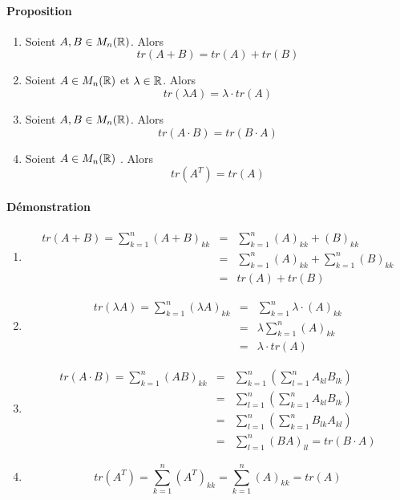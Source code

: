 \paragraph{Proposition}
\begin{enumerate}[1)]
  \item Soient $A, B \in M_{n}(\mathbb{R})$. Alors
    $$tr(A + B) = tr(A) + tr(B)$$
  \item Soient $A \in M_{n}(\mathbb{R})$ et $\lambda \in \mathbb{R}$. Alors
    $$tr(\lambda A) = \lambda \cdot tr(A)$$
  \item Soient $A, B \in M_{n}(\mathbb{R})$. Alors
    $$tr(A \cdot B) = tr(B \cdot A)$$
  \item Soient $A \in M_{n}(\mathbb{R})$ . Alors
    $$tr(A^{T}) = tr(A)$$
\end{enumerate}

\paragraph{Démonstration}
\begin{enumerate}[1)]
  \item 
    \begin{eqnarray*}
      tr(A + B) = \sum_{k=1}^{n}(A + B)_{kk} &=& \sum_{k=1}^{n}(A)_{kk} + (B)_{kk} \\
        &=& \sum_{k=1}^{n}(A)_{kk} + \sum_{k=1}^{n}(B)_{kk} \\
        &=& tr(A) + tr(B)
    \end{eqnarray*}
    
  \item
    \begin{eqnarray*}
      tr(\lambda A) = \sum_{k=1}^{n}(\lambda A)_{kk} &=& \sum_{k=1}^{n} \lambda \cdot (A)_{kk} \\
        &=& \lambda \sum_{k=1}^{n}(A)_{kk} \\
        &=& \lambda \cdot tr(A)
    \end{eqnarray*}
  
  \item 
    \begin{eqnarray*}
      tr(A \cdot B) = \sum_{k=1}^{n} (A B)_{kk} &=& \sum_{k=1}^{n} \left( \sum_{l=1}^{n} A_{kl} B_{lk} \right) \\
        &=& \sum_{l=1}^{n} \left( \sum_{k=1}^{n} A_{kl} B_{lk} \right) \\
        &=& \sum_{l=1}^{n} \left( \sum_{k=1}^{n} B_{lk} A_{kl} \right) \\
        &=& \sum_{l=1}^{n} (B A)_{ll} = tr(B \cdot A)
    \end{eqnarray*}
    
  \item
    $$tr(A^{T}) = \sum_{k=1}^{n} (A^{T})_{kk} = \sum_{k=1}^{n} (A)_{kk} = tr(A)$$
\end{enumerate}

